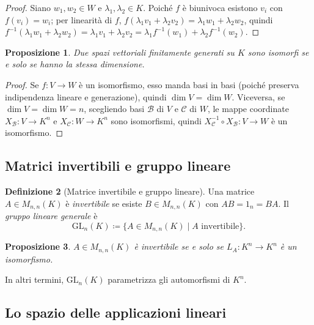 \documentclass[11pt, a4paper]{book}
\theoremstyle{definition}
\newtheorem{definizione}{Definizione}[section]
\theoremstyle{plain}
\newtheorem{proposizione}[definizione]{Proposizione}
\theoremstyle{remark}
\newcommand{\GL}{\mathrm{GL}}
\begin{document}
\begin{proof}
Siano $w_1, w_2 \in W$ e $\lambda_1, \lambda_2 \in K$. Poiché $f$ è biunivoca esistono $v_i$ con $f(v_i) = w_i$; per linearità di $f$, $f(\lambda_1 v_1 + \lambda_2 v_2) = \lambda_1 w_1 + \lambda_2 w_2$, quindi $f^{-1}(\lambda_1 w_1 + \lambda_2 w_2) = \lambda_1 v_1 + \lambda_2 v_2 = \lambda_1 f^{-1}(w_1) + \lambda_2 f^{-1}(w_2)$.
\end{proof}

\begin{proposizione}
Due spazi vettoriali finitamente generati su $K$ sono isomorfi se e solo se hanno la stessa dimensione.
\end{proposizione}

\begin{proof}
Se $f \colon V \to W$ è un isomorfismo, esso manda basi in basi (poiché preserva indipendenza lineare e generazione), quindi $\dim V = \dim W$. Viceversa, se $\dim V = \dim W = n$, scegliendo basi $\mathcal{B}$ di $V$ e $\mathcal{C}$ di $W$, le mappe coordinate $X_\mathcal{B} \colon V \to K^n$ e $X_\mathcal{C} \colon W \to K^n$ sono isomorfismi, quindi $X_\mathcal{C}^{-1} \circ X_\mathcal{B} \colon V \to W$ è un isomorfismo.
\end{proof}

\subsection{Matrici invertibili e gruppo lineare}

\begin{defbox}
\begin{definizione}[Matrice invertibile e gruppo lineare]
Una matrice $A \in M_{n,n}(K)$ è \emph{invertibile} se esiste $B \in M_{n,n}(K)$ con $AB = 1_n = BA$. Il \emph{gruppo lineare generale} è
\[
  \GL_n(K) \coloneqq \{A \in M_{n,n}(K) \mid A \text{ invertibile}\}.
\]
\end{definizione}
\end{defbox}

\begin{proposizione}
$A \in M_{n,n}(K)$ è invertibile se e solo se $L_A \colon K^n \to K^n$ è un isomorfismo.
\end{proposizione}

In altri termini, $\GL_n(K)$ parametrizza gli automorfismi di $K^n$.

\subsection{Lo spazio delle applicazioni lineari}
\end{document}
